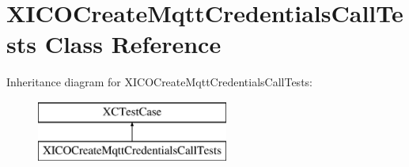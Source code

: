 \hypertarget{interface_x_i_c_o_create_mqtt_credentials_call_tests}{}\section{X\+I\+C\+O\+Create\+Mqtt\+Credentials\+Call\+Tests Class Reference}
\label{interface_x_i_c_o_create_mqtt_credentials_call_tests}
Inheritance diagram for X\+I\+C\+O\+Create\+Mqtt\+Credentials\+Call\+Tests\+:\begin{figure}[H]
\begin{center}
\leavevmode
\includegraphics[height=2.000000cm]{interface_x_i_c_o_create_mqtt_credentials_call_tests}
\end{center}
\end{figure}
